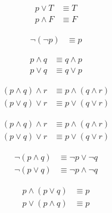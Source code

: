 \begin{tcolorbox}
	\begin{align}
		p \vee T   & \equiv T \\
		p \wedge F & \equiv F
	\end{align}
\end{tcolorbox}

\begin{tcolorbox}
	\begin{align}
		\neg (\neg p) & \equiv p
	\end{align}
\end{tcolorbox}

\begin{tcolorbox}
	\begin{align}
		p \wedge q & \equiv q \wedge p \\
		p \vee q   & \equiv q \vee p
	\end{align}
\end{tcolorbox}

\begin{tcolorbox}
	\begin{align}
		(p \wedge q) \wedge r & \equiv p \wedge (q \wedge r) \\
		(p \vee q) \vee r     & \equiv p \vee (q \vee r)
	\end{align}
\end{tcolorbox}

\begin{tcolorbox}
	\begin{align}
		(p \wedge q) \wedge r & \equiv p \wedge (q \wedge r) \\
		(p \vee q) \vee r     & \equiv p \vee (q \vee r)
	\end{align}
\end{tcolorbox}

\begin{tcolorbox}
	\begin{align}
		\neg (p \wedge q) & \equiv \neg p \vee \neg q   \\
		\neg (p \vee q)   & \equiv \neg p \wedge \neg q
	\end{align}
\end{tcolorbox}

\begin{tcolorbox}
	\begin{align}
		p \wedge (p \vee q) & \equiv p \\
		p \vee (p \wedge q) & \equiv p
	\end{align}
\end{tcolorbox}

